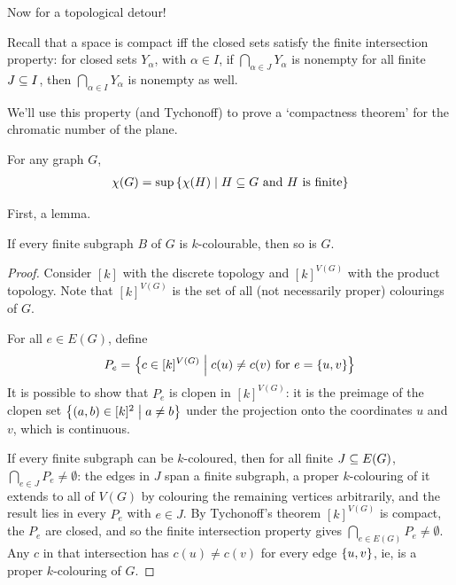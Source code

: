 Now for a topological detour!

Recall that a space is compact iff the closed sets satisfy the finite intersection property: for closed sets $Y_{\alpha}$, with $\alpha \in I$, if $\bigcap_{\alpha \in J} Y_{\alpha}$ is nonempty for all finite $J \subseteq I$, then $\bigcap_{\alpha \in I} Y_{\alpha}$ is nonempty as well.

We'll use this property (and Tychonoff) to prove a `compactness theorem' for the chromatic number of the plane.

\begin{boxtheorem} \label{Ch2:Thm:Compactness_Chromatic}
    For any graph $G$,
    \begin{align*}
        \chi(G) = \sup\left\{ \chi(H) \; \middle\vert \; H \subseteq G \text{ and } H \text{ is finite} \right\}
    \end{align*}
\end{boxtheorem}

First, a lemma.

\begin{boxlemma} \label{Ch2:Lemma:Compactness}
    If every finite subgraph $B$ of $G$ is $k$-colourable, then so is $G$.
\end{boxlemma}
\begin{proof}
    Consider $[k]$ with the discrete topology and $[k]^{V(G)}$ with the product topology. Note that $[k]^{V(G)}$ is the set of all (not necessarily proper) colourings of $G$.

    For all $e \in E(G)$, define
    \begin{align*}
        P_e = \left\{ c \in [k]^{V(G)} \; \middle\vert \; c(u) \ne c(v) \text{ for } e = \left\{ u, v \right\} \right\}
    \end{align*}
    It is possible to show that $P_e$ is clopen in $[k]^{V(G)}$: it is the preimage of the clopen set $\left\{ (a, b) \in [k]^2 \; \middle\vert \; a \neq b \right\}$ under the projection onto the coordinates $u$ and $v$, which is continuous. %

    If every finite subgraph can be $k$-coloured, then for all finite $J \subseteq E(G)$, $\bigcap_{e \in J} P_{e} \ne \emptyset$: the edges in $J$ span a finite subgraph, a proper $k$-colouring of it extends to all of $V(G)$ by colouring the remaining vertices arbitrarily, and the result lies in every $P_e$ with $e \in J$. By Tychonoff's theorem $[k]^{V(G)}$ is compact, the $P_e$ are closed, and so the finite intersection property gives $\bigcap_{e \in E(G)} P_e \ne \emptyset$. Any $c$ in that intersection has $c(u) \ne c(v)$ for every edge $\left\{ u, v \right\}$, ie, is a proper $k$-colouring of $G$.
\end{proof}

